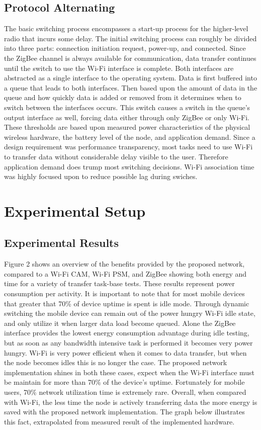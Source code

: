 \documentclass[conference]{IEEEtran}
\begin{document}
\subsection{Protocol Alternating}
The basic switching process encompasses a start-up process for the higher-level radio that incurs some delay.  The initial switching process can roughly be divided into three parts: connection initiation request, power-up, and connected.  Since the ZigBee channel is always available for communication, data transfer continues until the switch to use the Wi-Fi interface is complete.  Both interfaces are abstracted as a single interface to the operating system.  Data is first buffered into a queue that leads to both interfaces.  Then based upon the amount of data in the queue and how quickly data is added or removed from it determines when to switch between the interfaces occurs.  This switch causes a switch in the queue’s output interface as well, forcing data either through only ZigBee or only Wi-Fi.  These thresholds are based upon measured power characteristics of the physical wireless hardware, the battery level of the node, and application demand.  Since a design requirement was performance transparency, most tasks need to use Wi-Fi to transfer data without considerable delay visible to the user.  Therefore application demand does trump most switching decisions.  Wi-Fi association time was highly focused upon to reduce possible lag during swiches.

\section{Experimental Setup}
\subsection{Experimental Results}

Figure 2 shows an overview of the benefits provided by the proposed network, compared to a Wi-Fi CAM, Wi-Fi PSM, and ZigBee showing both energy and time for a variety of transfer task-base tests. These results represent power consumption per activity.  It is important to note that for most mobile devices that greater that 70\% of device uptime is spent is idle mode.  Through dynamic switching the mobile device can remain out of the power hungry Wi-Fi idle state, and only utilize it when larger data load become queued. Alone the ZigBee interface provides the lowest energy consumption advantage during idle testing, but as soon as any bandwidth intensive task is performed it becomes very power hungry.  Wi-Fi is very power efficient when it comes to data transfer, but when the node becomes idles this is no longer the case.  The proposed network implementation shines in both these cases, expect when the Wi-Fi interface must be maintain for more than 70\% of the device's uptime.  Fortunately for mobile users, 70\% network utilization time is extremely rare.  Overall, when compared with Wi-Fi, the less time the node is actively transferring data the more energy is saved with the proposed network implementation.  The graph below illustrates this fact, extrapolated from measured result of the implemented hardware.
\end{document}
